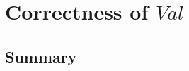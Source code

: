 \chapter[$Val$]{Correctness of $Val$}\label{ch19}

\newpage
\section{Summary}\label{ch19summary}

\ldefsummary %
\lthmsummary %
\lthmaddeddefsummary %
\lthmaddedthmsummary %
\lzevessummary %
